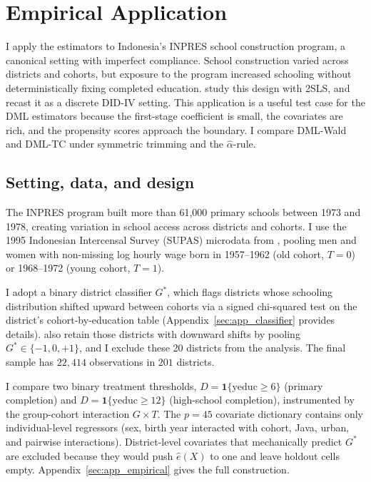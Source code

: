 \section{Empirical Application}\label{sec:6}

I apply the estimators to Indonesia's INPRES school construction program, a canonical setting with imperfect compliance. School construction varied across districts and cohorts, but exposure to the program increased schooling without deterministically fixing completed education. \citet{duflo2001schooling} study this design with 2SLS, and \citet{fuzzy2018} recast it as a discrete DID-IV setting. This application is a useful test case for the DML estimators because the first-stage coefficient is small, the covariates are rich, and the propensity scores approach the boundary. I compare DML-Wald and DML-TC under symmetric trimming and the $\hat{\alpha}$-rule.

\subsection{Setting, data, and design}\label{sec:6_setup}

The INPRES program built more than 61{,}000 primary schools between 1973 and 1978, creating variation in school access across districts and cohorts. I use the 1995 Indonesian Intercensal Survey (SUPAS) microdata from \citet{duflo2001schooling}, pooling men and women with non-missing log hourly wage born in 1957--1962 (old cohort, $T=0$) or 1968--1972 (young cohort, $T=1$).

I adopt a binary district classifier $G^*$, which flags districts whose schooling distribution shifted upward between cohorts via a signed chi-squared test on the district's cohort-by-education table (Appendix~\ref{sec:app_classifier} provides details). \citet{fuzzy2018} also retain those districts with downward shifts by pooling $G^* \in \{-1, 0, +1\}$, and I exclude these 20 districts from the analysis. The final sample has $22{,}414$ observations in $201$ districts.

I compare two binary treatment thresholds, $D=\mathbf{1}\{\text{yeduc} \geq 6\}$ (primary completion) and $D=\mathbf{1}\{\text{yeduc} \geq 12\}$ (high-school completion), instrumented by the group-cohort interaction $G \times T$. The $p = 45$ covariate dictionary contains only individual-level regressors (sex, birth year interacted with cohort, Java, urban, and pairwise interactions). District-level covariates that mechanically predict $G^*$ are excluded because they would push $\hat e(X)$ to one and leave holdout cells empty. Appendix~\ref{sec:app_empirical} gives the full construction.



